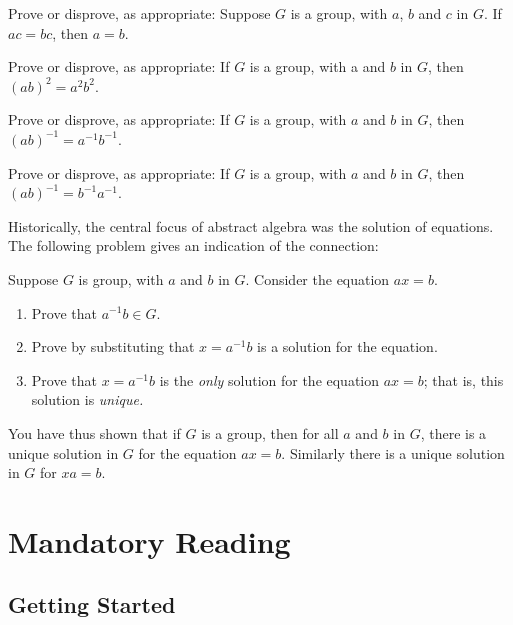 \begin{problem}
Prove or disprove, as appropriate: Suppose \(G\) is a group, with \(a\), \(b\) and \(c\) in \(G\). If \(ac = bc\), then \(a = b\).
\end{problem}

\begin{problem}
Prove or disprove, as appropriate: If \(G\) is a group, with a and \(b\) in \(G\), then \((ab)^2 = a^2b^2\).
\end{problem}

\begin{problem}
Prove or disprove, as appropriate: If \(G\) is a group, with \(a\) and \(b\) in \(G\), then \((ab)^{-1} = a^{-1}b^{-1}\).
\end{problem}

\begin{problem}
Prove or disprove, as appropriate: If \(G\) is a group, with \(a\) and \(b\) in \(G\), then \((ab)^{-1} = b^{-1}a^{-1}\).
\end{problem}

Historically, the central focus of abstract algebra was the solution of equations. The following problem gives an indication of the connection:

\begin{problem}
Suppose \(G\) is group, with \(a\) and \(b\) in \(G\). Consider the equation \(ax = b\).
\begin{enumerate}
  \item Prove that \(a^{-1}b \in G\).
  \item Prove by substituting that \(x = a^{-1}b\) is a solution for the equation.
  \item Prove that \(x = a^{-1}b\) is the \emph{only} solution for the equation \(ax = b\); that is, this solution is \emph{unique.}
\end{enumerate}
\end{problem}

You have thus shown that if \(G\) is a group, then for all \(a\) and \(b\) in \(G\), there is a unique solution in \(G\) for the equation \(ax = b\). Similarly there is a unique solution in \(G\) for \(xa = b\).

\chapter{Mandatory Reading}

\section{Getting Started}

